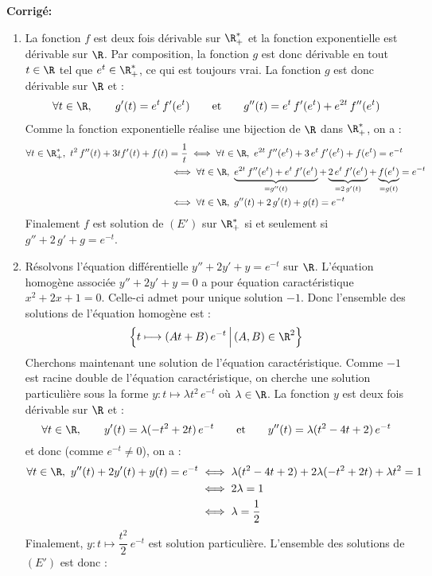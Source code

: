 \documentclass[a4paper,twoside,french,11pt]{VcCours}
\newcommand{\corr}{\textbf{Corrigé:}}
\begin{document}
\corr \begin{enumerate}
\item La fonction $f$ est deux fois dérivable sur $\R_+^*$ et la fonction exponentielle est dérivable sur $\R$. Par composition, la fonction $g$ est donc dérivable en tout $t\in \R$ tel que $ e^t \in \R_+^*$, ce qui est toujours vrai. La fonction $g$ est donc dérivable sur $\R$ et :
\begin{align*}
\forall t\in \R,\qquad g'(t)=e^t\,f'(e^{t})\qquad\textrm{et}\qquad g''(t)=e^{t}\,f'(e^{t})+e^{2t}\,f''(e^{t})
\end{align*}
Comme la fonction exponentielle réalise une bijection de $\R$ dans $\R_+^*$, on a :
\begin{align*}
\forall t\in \R_+^*,\ t^2\,f''(t) + 3 t f'(t)+f(t)  &= \dfrac{1}{t} \iff \forall t\in \R,\ e^{2t}\,f''(e^{t}) + 3 \,e^{t}\, f'(e^{t})+f(e^{t})  = e^{-t}\\
& \iff \forall t\in \R,\ \underbrace{e^{2t}\,f''(e^{t}) + e^{t}\,f'(e^{t})}_{=g''(t)}+\underbrace{2\,e^{t}\,f'(e^{t})}_{=2\,g'(t)}+
\underbrace{f(e^{t})}_{=g(t)}  = e^{-t}\\
&\iff \forall t\in \R,\ g''(t)+2\,g'(t)+g(t)=e^{-t}
\end{align*}
Finalement $f$ est solution de $(E')$ sur $\R_+^*$ si et seulement si $g''+2\,g'+g=e^{-t}$.
\item Résolvons l'équation différentielle $y''+2y'+y=e^{-t}$ sur $\R$. L'équation homogène associée $y''+2y'+y=0$ a pour équation caractéristique $x^2+2x+1=0$. Celle-ci admet pour unique solution $-1$. Donc l'ensemble des solutions de l'équation homogène est :
$$
\Big\{t \longmapsto (At+B)\,e^{-t}\,\Big|\,(A,B)\in \R^2\Big\}
$$
Cherchons maintenant une solution de l'équation caractéristique. Comme $-1$ est racine double de l'équation caractéristique, on cherche une solution particulière sous la forme $y : t \longmapsto \lambda t^2\,e^{-t}$ où $\lambda \in \R$. La fonction $y$ est deux fois dérivable sur $\R$ et :
$$
\forall t\in \R,\qquad y'(t)=\lambda(-t^2+2t)\,e^{-t}\qquad\textrm{et}\qquad y''(t)=\lambda(t^2-4t+2)\,e^{-t}
$$
et donc (comme $e^{-t}\ne 0$), on a :
\begin{align*}
\forall t\in \R,\ y''(t)+2y'(t)+y(t)=e^{-t}&\iff \lambda(t^2-4t+2)+2\lambda(-t^2+2t)+\lambda t^2=1\\
&\iff 2\lambda=1\\
&\iff \lambda=\dfrac{1}{2}
\end{align*}
Finalement, $y : t \longmapsto \dfrac{t^2}{2}\,e^{-t}$ est solution particulière. L'ensemble des solutions de $(E')$ est donc :

\end{enumerate}
\end{document}
